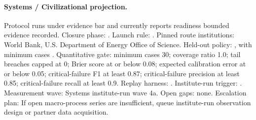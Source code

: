 \paragraph{Systems / Civilizational projection.}
Protocol  runs under evidence bar  and currently reports readiness bounded evidence recorded.
Closure phase: . Launch rule: .
Pinned route institutions: World Bank, \allowbreak U.S. Department of Energy Office of Science.
Held-out policy: , with minimum cases .
Quantitative gate: minimum cases 30; coverage ratio 1.0; tail breaches capped at 0; Brier score at or below 0.08; expected calibration error at or below 0.05; critical-failure F1 at least 0.87; critical-failure precision at least 0.85; critical-failure recall at least 0.9.
Replay harness: .
Institute-run trigger: . Measurement wave: Systems institute-run wave 4a.
Open gaps: none.
Escalation plan: If open macro-process series are insufficient, queue institute-run observation design or partner data acquisition.
